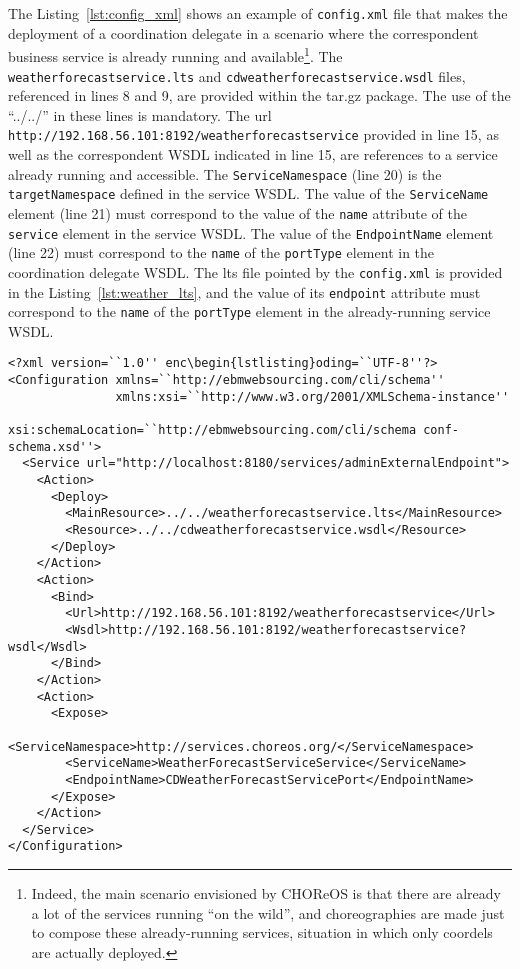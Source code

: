 The Listing~\ref{lst:config_xml} shows an example of \texttt{config.xml} file that makes the deployment of a coordination delegate in a scenario where the correspondent business service is already running and available\footnote{Indeed, the main scenario envisioned by CHOReOS is that there are already a lot of the services running ``on the wild'', and choreographies are made just to compose these already-running services, situation in which only coordels are actually deployed.}. The \texttt{weatherforecastservice.lts} and \texttt{cdweatherforecastservice.wsdl} files, referenced in lines 8 and 9, are provided within the tar.gz package. The use of the ``../../'' in these lines is mandatory. The url \texttt{http://192.168.56.101:8192/weatherforecastservice} provided in line 15, as well as the correspondent WSDL indicated in line 15, are references to a service already running and accessible. The \texttt{ServiceNamespace} (line 20) is the \texttt{targetNamespace} defined in the service WSDL. The value of the \texttt{ServiceName} element (line 21) must correspond to the value of the \texttt{name} attribute of the \texttt{service} element in the service WSDL. The value of the \texttt{EndpointName} element (line 22) must correspond to the \texttt{name} of the \texttt{portType} element in the coordination delegate WSDL. The lts file pointed by the \texttt{config.xml} is provided in the Listing~\ref{lst:weather_lts}, and the value of its \texttt{endpoint} attribute must correspond to the \texttt{name} of the \texttt{portType} element in the already-running service WSDL.

{\footnotesize
\begin{lstlisting}[caption=Example of \texttt{config.xml} that deploys a coordination delegate, label=lst:config_xml]
<?xml version=``1.0'' enc\begin{lstlisting}oding=``UTF-8''?>
<Configuration xmlns=``http://ebmwebsourcing.com/cli/schema'' 
               xmlns:xsi=``http://www.w3.org/2001/XMLSchema-instance''
               xsi:schemaLocation=``http://ebmwebsourcing.com/cli/schema conf-schema.xsd''>
  <Service url="http://localhost:8180/services/adminExternalEndpoint">
    <Action>
      <Deploy>
        <MainResource>../../weatherforecastservice.lts</MainResource>
        <Resource>../../cdweatherforecastservice.wsdl</Resource>
      </Deploy>
    </Action>
    <Action>
      <Bind>
        <Url>http://192.168.56.101:8192/weatherforecastservice</Url>
        <Wsdl>http://192.168.56.101:8192/weatherforecastservice?wsdl</Wsdl>
      </Bind>
    </Action>
    <Action>
      <Expose>
        <ServiceNamespace>http://services.choreos.org/</ServiceNamespace>
        <ServiceName>WeatherForecastServiceService</ServiceName>
        <EndpointName>CDWeatherForecastServicePort</EndpointName>
      </Expose>
    </Action>
  </Service>
</Configuration>
\end{lstlisting}
}

